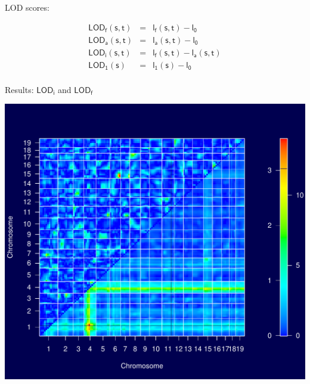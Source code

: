 \documentclass[12pt]{article}
\newcommand{\headsize}{\fontsize{35}{35} \selectfont}
\newcommand{\smallsize}{\fontsize{25}{30} \selectfont}
\newcommand{\lod}{\text{LOD}}
\begin{document}
\vspace{2cm}

\color{mywhite} \smallsize

\hfill \begin{minipage}[t]{10in}
LOD scores:

\vspace{5mm}

\hspace{1cm}
\begin{minipage}{5in}
{\color{myblue}
\begin{eqnarray*}
\mathsf{\lod_f(s,t)}& = &\mathsf{l_f(s,t) - l_0} \\[24pt]
\mathsf{\lod_a(s,t)}& = &\mathsf{l_a(s,t) - l_0} \\[24pt]
\mathsf{\lod_i(s,t)}& = &\mathsf{l_f(s,t) - l_a(s,t)} \\[24pt]
\mathsf{\lod_1(s)}&   = &\mathsf{l_1(s) - l_0} \\[24pt]
\end{eqnarray*}
}
\end{minipage}



\end{minipage}


\newpage

\headsize \color{myyellow}
\hfill \begin{minipage}{5.75in}
\centering
Results: $\mathsf{\lod_i}$ and $\mathsf{\lod_f}$
\end{minipage}

\vfill

\centerline{\includegraphics{FigsB/2dscan_allchr.pdf}}
\end{document}
